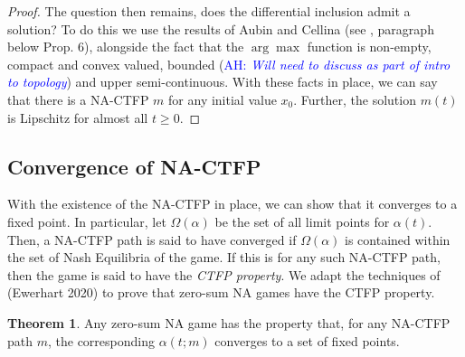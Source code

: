 \documentclass{article}
\theoremstyle{definition}
\newtheorem{theorem}{Theorem}
\newcommand{\ah}[1]{\textcolor{blue}{AH: \textit{#1}}}
\begin{document}
\begin{proof}
    The question then remains, does the differential inclusion admit a solution? To do this we use the
    results of Aubin and Cellina (see \cite{Harris1998}, paragraph below Prop. 6), alongside the fact
    that the $\arg \max$ function is non-empty, compact and convex valued, bounded (\ah{Will need to discuss as part of intro to topology}) and upper semi-continuous. 
    With these facts in place, we can say that there is a NA-CTFP $m$ for any initial value $x_0$. Further, the solution $m(t)$ is Lipschitz for almost all $t \geq 0$.

  \end{proof}

\subsection{Convergence of NA-CTFP}

With the existence of the NA-CTFP in place, we can show that it converges
to a fixed point. In particular, let $\Omega(\alpha)$ be the set of
all limit points for $\alpha(t)$. Then, a NA-CTFP path is said to have
converged if $\Omega(\alpha)$ is contained within the set of Nash
Equilibria of the game. If this is for any such NA-CTFP path, then the
game is said to have the \emph{CTFP property}. We adapt the techniques
of (Ewerhart 2020) to prove that zero-sum NA games have the CTFP
property.

  \begin{theorem}
    Any zero-sum NA game has the property that, for any NA-CTFP path $m$, the corresponding $\alpha(t; m)$ converges to a set of fixed points.
  \end{theorem}
\end{document}
